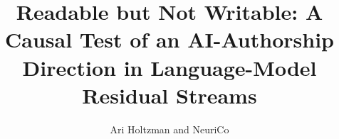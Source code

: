 \documentclass{article}
\author{Ari Holtzman and NeuriCo}
\title{Readable but Not Writable: A Causal Test of an AI-Authorship Direction in Language-Model Residual Streams}
\begin{document}
\maketitle

\begin{abstract}

\end{abstract}










\appendix


\end{document}
